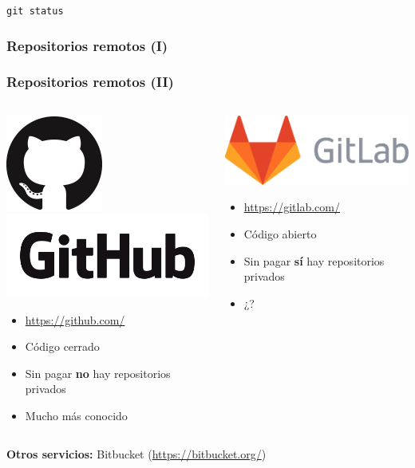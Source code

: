 \documentclass{beamer}
\begin{document}
\begin{frame}
	\begin{block}{\texttt{git status}}
		
	\end{block}
\end{frame}


\begin{frame}\frametitle{Repositorios remotos (I)}

\end{frame}

\begin{frame}\frametitle{Repositorios remotos (II)}
	\begin{columns}
		\begin{column}{0.5\textwidth}
			\begin{center}
				\includegraphics[height = 1.3 cm]{fig/github/GitHub-Mark-120px-plus.png}
				\includegraphics[height = 1.3 cm]{fig/github/GitHub_Logo.png}
			\end{center}
			\begin{itemize}
				\item \url{https://github.com/}
				\item Código cerrado
				\item Sin pagar \textbf{no} hay repositorios privados
				\item Mucho más conocido
			\end{itemize}
		\end{column}
		\begin{column}{0.5\textwidth}
			\begin{center}
				\includegraphics[height = 1.3 cm]{fig/gitlab_wm_no_bg.pdf}
			\end{center}
			\begin{itemize}
				\item \url{https://gitlab.com/}
				\item Código abierto
				\item Sin pagar \textbf{sí} hay repositorios privados
				\item ¿?
			\end{itemize}
		\end{column}
	\end{columns}

\vspace{0.5cm}

\textbf{Otros servicios:} Bitbucket (\url{https://bitbucket.org/})

\end{frame}
\end{document}

